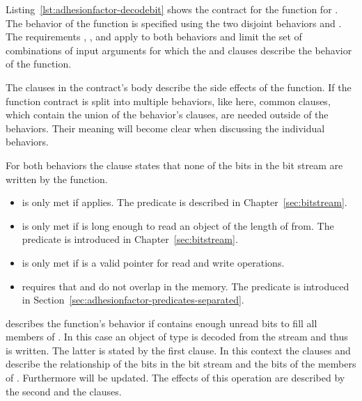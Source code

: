 Listing~\ref{lst:adhesionfactor-decodebit} shows the contract for the  function
for .
The behavior of the function is specified using the two disjoint behaviors
 and .
The requirements , ,
 and  apply to both behaviors
and limit the set of combinations of input arguments for which the
 and  clauses describe the behavior of the function.

The  clauses in the contract's body describe the side effects
of the function. If the function contract is split into multiple
behaviors, like here, common  clauses, which contain the union
of the behavior's  clauses, are needed outside of the behaviors.
Their meaning will become clear when discussing the individual  behaviors.

For both behaviors the  clause states that
none of the bits in the bit stream are written by the function.

\begin{itemize}
\item
{} is only met if  applies.
The  predicate is described in Chapter~\ref{sec:bitstream}.
\item
{} is only met if 
is long enough to read an object of the length of  from.
The  predicate is introduced in Chapter~\ref{sec:bitstream}.
\item
{} is only met if  is a valid pointer for read and write operations.
\item
{} requires that  and  do not overlap in the memory.
The  predicate is introduced in
Section~\ref{sec:adhesionfactor-predicates-separated}.
\end{itemize}




 describes the function's behavior if
 contains enough unread bits to fill all members of . 
In this case an object of type  is decoded from the stream
and thus  is written.
The latter is stated by the first  clause.
In this context the  clauses  and 
describe the relationship of the bits in the bit stream and
the bits of the members of .
Furthermore  will be updated.
The effects of this operation are described by the second
 and the  clauses.

